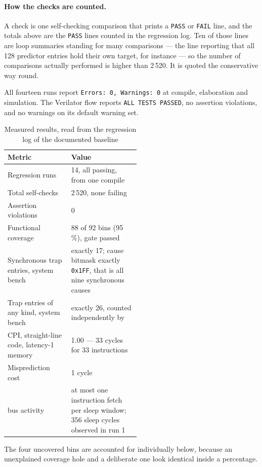 \paragraph{How the checks are counted.} A check is one self-checking comparison
that prints a \texttt{PASS} or \texttt{FAIL} line, and the totals above are the
\texttt{PASS} lines counted in the regression log. Ten of those lines are loop
summaries standing for many comparisons --- the line reporting that all 128
predictor entries hold their own target, for instance --- so the number of
comparisons actually performed is higher than 2\,520. It is quoted the
conservative way round.

All fourteen runs report \texttt{Errors: 0, Warnings: 0} at compile, elaboration
and simulation. The Verilator flow reports \texttt{ALL TESTS PASSED}, no
assertion violations, and no warnings on its default warning set.

\begin{table}[H]
\centering
\caption{Measured results, read from the regression log of the documented baseline}
\label{tab:measured}
\begin{tabular}{@{}lL{0.52\linewidth}@{}}
\toprule
\textbf{Metric} & \textbf{Value} \\
\midrule
Regression runs        & 14, all passing, from one compile \\
Total self-checks      & 2\,520, none failing \\
Assertion violations   & 0 \\
Functional coverage    & 88 of 92 bins (95\,\%), gate passed \\
Synchronous trap entries, system bench & exactly 17; cause bitmask exactly
  \texttt{0x1FF}, that is all nine synchronous causes \\
Trap entries of any kind, system bench & exactly 26, counted independently by
   \\
CPI, straight-line code, latency-1 memory & 1.00 --- 33 cycles for 33
  instructions \\
Misprediction cost     & 1 cycle \\
 bus activity & at most one instruction fetch per sleep window;
  356 sleep cycles observed in run 1 \\
\bottomrule
\end{tabular}
\end{table}

The four uncovered bins are accounted for individually below, because an
unexplained coverage hole and a deliberate one look identical inside a
percentage.

